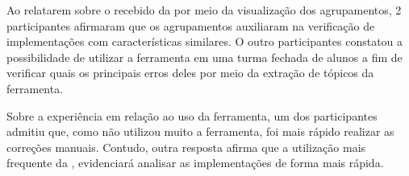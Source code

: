 		Ao relatarem sobre o  recebido da 
		por meio da visualização dos agrupamentos, 2 participantes afirmaram que
		os agrupamentos auxiliaram na verificação de implementações com características
		similares. O outro participantes constatou a possibilidade de utilizar a
		ferramenta em uma turma fechada de alunos a fim de verificar quais os principais
		erros deles por meio da extração de tópicos da ferramenta.
		
		Sobre a experiência em relação ao uso da ferramenta, um dos participantes
		admitiu que, como não utilizou muito a ferramenta, foi mais rápido realizar
		as correções manuais. Contudo, outra resposta afirma que a utilização mais
		frequente da , evidenciará analisar as implementações
		de forma mais rápida.
		
